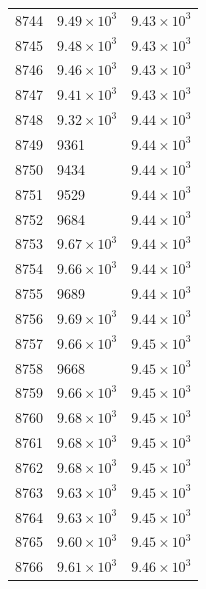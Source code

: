 \begin{table}[H]
\begin{tabular}{lll}
8744 & $\displaystyle 9.49 \times 10^{3}$ & $\displaystyle 9.43 \times 10^{3}$ \\
8745 & $\displaystyle 9.48 \times 10^{3}$ & $\displaystyle 9.43 \times 10^{3}$ \\
8746 & $\displaystyle 9.46 \times 10^{3}$ & $\displaystyle 9.43 \times 10^{3}$ \\
8747 & $\displaystyle 9.41 \times 10^{3}$ & $\displaystyle 9.43 \times 10^{3}$ \\
8748 & $\displaystyle 9.32 \times 10^{3}$ & $\displaystyle 9.44 \times 10^{3}$ \\
8749 & 9361 & $\displaystyle 9.44 \times 10^{3}$ \\
8750 & 9434 & $\displaystyle 9.44 \times 10^{3}$ \\
8751 & 9529 & $\displaystyle 9.44 \times 10^{3}$ \\
8752 & 9684 & $\displaystyle 9.44 \times 10^{3}$ \\
8753 & $\displaystyle 9.67 \times 10^{3}$ & $\displaystyle 9.44 \times 10^{3}$ \\
8754 & $\displaystyle 9.66 \times 10^{3}$ & $\displaystyle 9.44 \times 10^{3}$ \\
8755 & 9689 & $\displaystyle 9.44 \times 10^{3}$ \\
8756 & $\displaystyle 9.69 \times 10^{3}$ & $\displaystyle 9.44 \times 10^{3}$ \\
8757 & $\displaystyle 9.66 \times 10^{3}$ & $\displaystyle 9.45 \times 10^{3}$ \\
8758 & 9668 & $\displaystyle 9.45 \times 10^{3}$ \\
8759 & $\displaystyle 9.66 \times 10^{3}$ & $\displaystyle 9.45 \times 10^{3}$ \\
8760 & $\displaystyle 9.68 \times 10^{3}$ & $\displaystyle 9.45 \times 10^{3}$ \\
8761 & $\displaystyle 9.68 \times 10^{3}$ & $\displaystyle 9.45 \times 10^{3}$ \\
8762 & $\displaystyle 9.68 \times 10^{3}$ & $\displaystyle 9.45 \times 10^{3}$ \\
8763 & $\displaystyle 9.63 \times 10^{3}$ & $\displaystyle 9.45 \times 10^{3}$ \\
8764 & $\displaystyle 9.63 \times 10^{3}$ & $\displaystyle 9.45 \times 10^{3}$ \\
8765 & $\displaystyle 9.60 \times 10^{3}$ & $\displaystyle 9.45 \times 10^{3}$ \\
8766 & $\displaystyle 9.61 \times 10^{3}$ & $\displaystyle 9.46 \times 10^{3}$ \\

\end{tabular}
\end{table}

